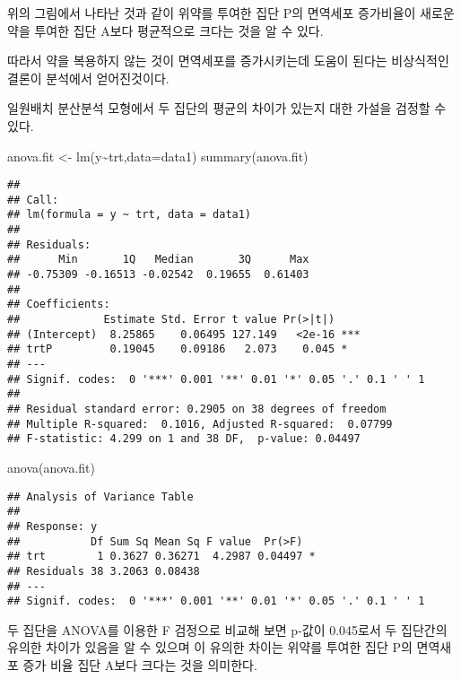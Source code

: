\documentclass[
]{book}
\newenvironment{Shaded}{\begin{snugshade}}{\end{snugshade}}
\newcommand{\AttributeTok}[1]{\textcolor[rgb]{0.77,0.63,0.00}{#1}}
\newcommand{\FunctionTok}[1]{\textcolor[rgb]{0.00,0.00,0.00}{#1}}
\newcommand{\NormalTok}[1]{#1}
\newcommand{\OtherTok}[1]{\textcolor[rgb]{0.56,0.35,0.01}{#1}}
\newcommand{\SpecialCharTok}[1]{\textcolor[rgb]{0.00,0.00,0.00}{#1}}
\begin{document}
위의 그림에서 나타난 것과 같이 위약를 투여한 집단 P의 면역세포 증가비율이 새로운 약을 투여한 집단 A보다 평균적으로 크다는 것을 알 수 있다.

따라서 약을 복용하지 않는 것이 면역세포를 증가시키는데 도움이 된다는 비상식적인 결론이 분석에서 얻어진것이다.

일원배치 분산분석 모형에서 두 집단의 평균의 차이가 있는지 대한 가설을 검정할 수 있다.

\begin{Shaded}
\begin{Highlighting}[]
\NormalTok{anova.fit }\OtherTok{\textless{}{-}} \FunctionTok{lm}\NormalTok{(y}\SpecialCharTok{\textasciitilde{}}\NormalTok{trt,}\AttributeTok{data=}\NormalTok{data1)}
\FunctionTok{summary}\NormalTok{(anova.fit)}
\end{Highlighting}
\end{Shaded}

\begin{verbatim}
## 
## Call:
## lm(formula = y ~ trt, data = data1)
## 
## Residuals:
##      Min       1Q   Median       3Q      Max 
## -0.75309 -0.16513 -0.02542  0.19655  0.61403 
## 
## Coefficients:
##             Estimate Std. Error t value Pr(>|t|)    
## (Intercept)  8.25865    0.06495 127.149   <2e-16 ***
## trtP         0.19045    0.09186   2.073    0.045 *  
## ---
## Signif. codes:  0 '***' 0.001 '**' 0.01 '*' 0.05 '.' 0.1 ' ' 1
## 
## Residual standard error: 0.2905 on 38 degrees of freedom
## Multiple R-squared:  0.1016, Adjusted R-squared:  0.07799 
## F-statistic: 4.299 on 1 and 38 DF,  p-value: 0.04497
\end{verbatim}

\begin{Shaded}
\begin{Highlighting}[]
\FunctionTok{anova}\NormalTok{(anova.fit)}
\end{Highlighting}
\end{Shaded}

\begin{verbatim}
## Analysis of Variance Table
## 
## Response: y
##           Df Sum Sq Mean Sq F value  Pr(>F)  
## trt        1 0.3627 0.36271  4.2987 0.04497 *
## Residuals 38 3.2063 0.08438                  
## ---
## Signif. codes:  0 '***' 0.001 '**' 0.01 '*' 0.05 '.' 0.1 ' ' 1
\end{verbatim}

두 집단을 ANOVA를 이용한 F 검정으로 비교해 보면 p-값이 0.045로서
두 집단간의 유의한 차이가 있음을 알 수 있으며 이 유의한 차이는 위약를 투여한 집단 P의 면역새포 증가 비율 집단 A보다 크다는 것을 의미한다.
\end{document}
